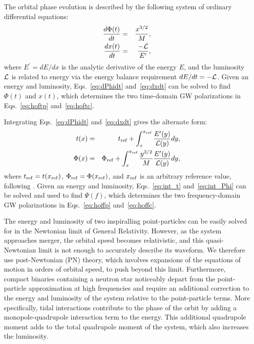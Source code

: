 \documentclass[twocolumn,prd,amssymb,aps,nofootinbib,showpacs,epsf]{revtex4}
\begin{document}
The orbital phase evolution is described by the following system of ordinary differential equations:
\begin{eqnarray}
\label{eq:dPhidt}
\frac{d\Phi(t)}{dt}&=&\frac{x^{3/2}}{M},\\
\label{eq:dxdt}
\frac{d x(t)}{dt}&=&\frac{-{\cal L}}{E^{\prime}},
\end{eqnarray}
where $E^{\prime}=dE/dx$ is the analytic derivative of the energy $E$, and the luminosity ${\cal L}$ is related to energy via the energy balance requirement $dE/dt=-{\cal L}$.  Given an energy and luminosity, Eqs.~\eqref{eq:dPhidt} and~\eqref{eq:dxdt} can be solved to find $\Phi(t)$ and $x(t)$, which determines the two time-domain GW polarizations in Eqs.~\eqref{eq:hoftp} and~\eqref{eq:hoftc}.

Integrating Eqs.~\eqref{eq:dPhidt} and~\eqref{eq:dxdt} gives the alternate form:
\begin{eqnarray}
\label{eq:int_t}
t(x)&=&t_{\rm ref}+\int_x^{x_{\rm ref}}\frac{E^\prime(y)}{{\cal L}(y)}dy,\\
\label{eq:int_Phi}
\Phi(x)&=&\Phi_{\rm ref}+\int_x^{x_{\rm ref}}\frac{y^{3/2}}{M}\frac{E^\prime(y)}{{\cal L}(y)}dy,
\end{eqnarray}
where $t_{\rm ref}=t(x_{\rm ref})$, $\Phi_{\rm ref}=\Phi(x_{\rm ref})$, and $x_{\rm ref}$ is an arbitrary reference value, following \cite{BuonannoIyerOchsner2009}.  Given an energy and luminosity, Eqs.~\eqref{eq:int_t} and~\eqref{eq:int_Phi} can be solved and used to find $\Psi(f)$, which determines the two frequency-domain GW polarizations in Eqs.~\eqref{eq:hoffp} and~\eqref{eq:hoffc}.

The energy and luminosity of two inspiralling point-particles can be easily solved for in the Newtonian limit of General Relativity.  However, as the system approaches merger, the orbital speed becomes relativistic, and this quasi-Newtonian limit is not enough to accurately describe its waveform.  We therefore use post-Newtonian (PN) theory, which involves expansions of the equations of motion in orders of orbital speed, to push beyond this limit.  Furthermore, compact binaries containing a neutron star noticeably depart from the point-particle approximation at high frequencies and require an additional correction to the energy and luminosity of the system relative to the point-particle terms.  More specifically, tidal interactions contribute to the phase of the orbit by adding a monopole-quadrupole interaction term to the energy.  This additional quadrupole moment adds to the total quadrupole moment of the system, which also increases the luminosity.
\end{document}
